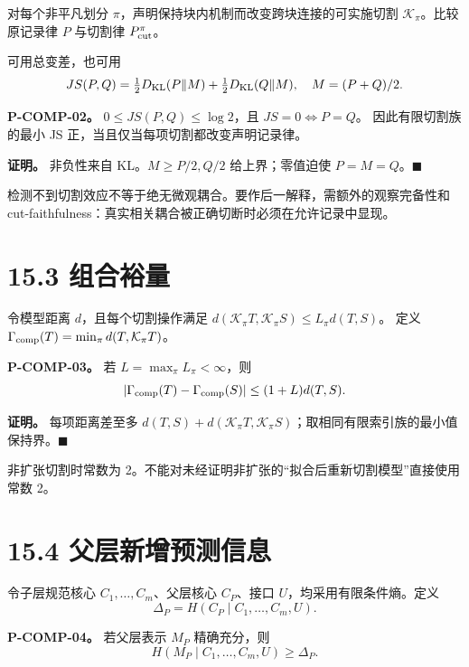 \documentclass[
  11pt,
  oneside]{book}
\begin{document}
对每个非平凡划分 \(\pi\)，声明保持块内机制而改变跨块连接的可实施切割 \(\mathcal K_\pi\)。比较原记录律 \(P\) 与切割律 \(P^\pi_{\rm cut}\)。

可用总变差，也可用 \[JS(P,Q)=\tfrac12D_{\rm KL}(P\|M)+\tfrac12D_{\rm KL}(Q\|M),
\quad M=(P+Q)/2.\]

\hypertarget{p-comp-02}{}\label{p-comp-02}

\textbf{P-COMP-02。} \(0\le JS(P,Q)\le\log2\)，且 \(JS=0\iff P=Q\)。 因此有限切割族的最小 JS 正，当且仅当每项切割都改变声明记录律。

\textbf{证明。} 非负性来自 KL。\(M\ge P/2,Q/2\) 给上界；零值迫使 \(P=M=Q\)。\(\blacksquare\)

检测不到切割效应不等于绝无微观耦合。要作后一解释，需额外的观察完备性和 cut-faithfulness：真实相关耦合被正确切断时必须在允许记录中显现。

\section{15.3 组合裕量}\label{ux7ec4ux5408ux88d5ux91cf}

令模型距离 \(d\)，且每个切割操作满足 \(d(\mathcal K_\pi T,\mathcal K_\pi S)\le L_\pi d(T,S)\)。 定义 \(\Gamma_{\rm comp}(T)=\min_\pi d(T,\mathcal K_\pi T)\)。

\hypertarget{p-comp-03}{}\label{p-comp-03}

\textbf{P-COMP-03。} 若 \(L=\max_\pi L_\pi<\infty\)，则 \[|\Gamma_{\rm comp}(T)-\Gamma_{\rm comp}(S)|
\le(1+L)d(T,S).\]

\textbf{证明。} 每项距离差至多 \(d(T,S)+d(\mathcal K_\pi T,\mathcal K_\pi S)\)；取相同有限索引族的最小值保持界。\(\blacksquare\)

非扩张切割时常数为 2。不能对未经证明非扩张的``拟合后重新切割模型''直接使用常数 2。

\section{15.4 父层新增预测信息}\label{ux7236ux5c42ux65b0ux589eux9884ux6d4bux4fe1ux606f}

令子层规范核心 \(C_1,\ldots,C_m\)、父层核心 \(C_P\)、接口 \(U\)，均采用有限条件熵。定义 \[\Delta_P=H(C_P\mid C_1,\ldots,C_m,U).\]

\hypertarget{p-comp-04}{}\label{p-comp-04}

\textbf{P-COMP-04。} 若父层表示 \(M_P\) 精确充分，则 \[H(M_P\mid C_1,\ldots,C_m,U)\ge\Delta_P.\]
\end{document}
